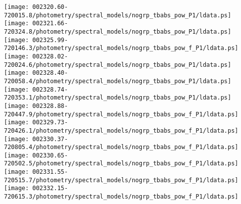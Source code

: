 \documentclass{aastex}
\begin{document}
\begin{figure*}[!ht]
\centering
\texttt{[image: 002320.60-720015.8/photometry/spectral\_models/nogrp\_tbabs\_pow\_P1/ldata.ps]} \hfill 
\texttt{[image: 002321.66-720324.8/photometry/spectral\_models/nogrp\_tbabs\_pow\_P1/ldata.ps]} \hfill 
\texttt{[image: 002325.99-720146.3/photometry/spectral\_models/nogrp\_tbabs\_pow\_f\_P1/ldata.ps]} \\ 
\vspace*{0.5in}
\texttt{[image: 002328.02-720024.6/photometry/spectral\_models/nogrp\_tbabs\_pow\_P1/ldata.ps]} \hfill 
\texttt{[image: 002328.40-720058.4/photometry/spectral\_models/nogrp\_tbabs\_pow\_P1/ldata.ps]} \hfill 
\texttt{[image: 002328.74-720353.1/photometry/spectral\_models/nogrp\_tbabs\_pow\_P1/ldata.ps]} \\ 
\vspace*{0.5in}
\texttt{[image: 002328.88-720447.9/photometry/spectral\_models/nogrp\_tbabs\_pow\_f\_P1/ldata.ps]} \hfill 
\texttt{[image: 002329.73-720426.1/photometry/spectral\_models/nogrp\_tbabs\_pow\_f\_P1/ldata.ps]} \hfill 
\texttt{[image: 002330.37-720805.4/photometry/spectral\_models/nogrp\_tbabs\_pow\_f\_P1/ldata.ps]} \\ 
\vspace*{0.5in}
\texttt{[image: 002330.65-720502.5/photometry/spectral\_models/nogrp\_tbabs\_pow\_f\_P1/ldata.ps]} \hfill 
\texttt{[image: 002331.55-720515.7/photometry/spectral\_models/nogrp\_tbabs\_pow\_f\_P1/ldata.ps]} \hfill 
\texttt{[image: 002332.15-720615.3/photometry/spectral\_models/nogrp\_tbabs\_pow\_f\_P1/ldata.ps]} \\ 
\vspace*{0.5in}
\end{figure*}
\clearpage
\end{document}
